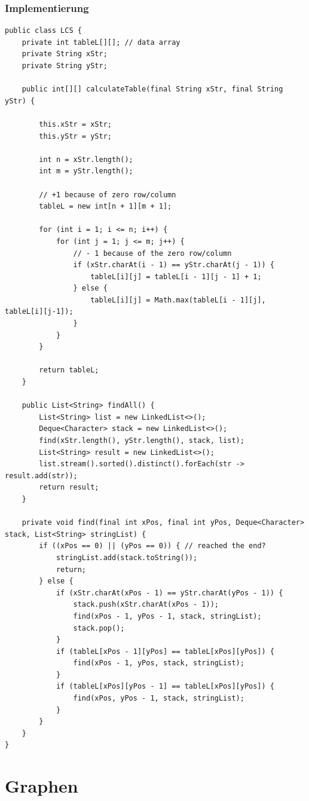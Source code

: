 \subsubsection{Implementierung}
\begin{lstlisting}
public class LCS {
	private int tableL[][]; // data array
	private String xStr;
	private String yStr;

	public int[][] calculateTable(final String xStr, final String yStr) {

		this.xStr = xStr;
		this.yStr = yStr;

		int n = xStr.length();
		int m = yStr.length();

		// +1 because of zero row/column
		tableL = new int[n + 1][m + 1];

		for (int i = 1; i <= n; i++) {
			for (int j = 1; j <= m; j++) {
				// - 1 because of the zero row/column
				if (xStr.charAt(i - 1) == yStr.charAt(j - 1)) {
					tableL[i][j] = tableL[i - 1][j - 1] + 1; 
				} else {
					tableL[i][j] = Math.max(tableL[i - 1][j], tableL[i][j-1]);
				}
			}
		}

		return tableL;
	}

	public List<String> findAll() {
		List<String> list = new LinkedList<>();
		Deque<Character> stack = new LinkedList<>();
		find(xStr.length(), yStr.length(), stack, list);
		List<String> result = new LinkedList<>();
		list.stream().sorted().distinct().forEach(str -> result.add(str));
		return result;
	}

	private void find(final int xPos, final int yPos, Deque<Character> stack, List<String> stringList) {
		if ((xPos == 0) || (yPos == 0)) { // reached the end?
			stringList.add(stack.toString());
			return;
		} else {
			if (xStr.charAt(xPos - 1) == yStr.charAt(yPos - 1)) {
				stack.push(xStr.charAt(xPos - 1));
				find(xPos - 1, yPos - 1, stack, stringList);
				stack.pop();
			}
			if (tableL[xPos - 1][yPos] == tableL[xPos][yPos]) {
				find(xPos - 1, yPos, stack, stringList);
			}
			if (tableL[xPos][yPos - 1] == tableL[xPos][yPos]) {
				find(xPos, yPos - 1, stack, stringList);
			}
		}
	}
}
\end{lstlisting}

\section{Graphen}
